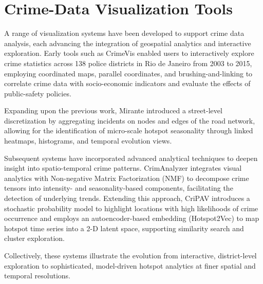 \section{Crime-Data Visualization Tools}


A range of visualization systems have been developed to support crime data analysis, each advancing the integration of geospatial analytics and interactive exploration. Early tools such as CrimeVis \citep{Silva2017CrimeVisAI} enabled users to interactively explore crime statistics across 138 police districts in Rio de Janeiro from 2003 to 2015, employing coordinated maps, parallel coordinates, and brushing-and-linking to correlate crime data with socio-economic indicators and evaluate the effects of public-safety policies. 

Expanding upon the previous work, Mirante \citep{Garcia2020MiranteAV} introduced a street-level discretization by aggregating incidents on nodes and edges of the road network, allowing for the identification of micro-scale hotspot seasonality through linked heatmaps, histograms, and temporal evolution views.

Subsequent systems have incorporated advanced analytical techniques to deepen insight into spatio-temporal crime patterns. CrimAnalyzer \citep{Garcia2021CrimAnalyzer} integrates visual analytics with Non-negative Matrix Factorization (NMF) to decompose crime tensors into intensity- and seasonality-based components, facilitating the detection of underlying trends. Extending this approach, CriPAV \citep{Garcia2022CriPAV} introduces a stochastic probability model to highlight locations with high likelihoods of crime occurrence and employs an autoencoder-based embedding (Hotspot2Vec) to map hotspot time series into a 2-D latent space, supporting similarity search and cluster exploration. 

Collectively, these systems illustrate the evolution from interactive, district-level exploration to sophisticated, model-driven hotspot analytics at finer spatial and temporal resolutions.



